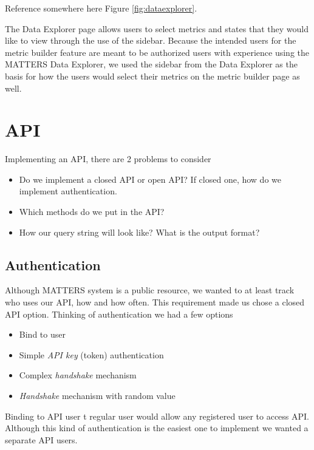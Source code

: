 			Reference somewhere here Figure \ref{fig:dataexplorer}.
			
			The Data Explorer page allows users to select metrics and states that they would like to view through the use of the sidebar. 
			Because the intended users for the metric builder feature are meant to be authorized users with 
			experience using the MATTERS Data Explorer, we used the sidebar from the Data Explorer as the 
			basis for how the users would select their metrics on the metric builder page as well.  

	\section{API}
			
			Implementing an API, there are 2 problems to consider
			\begin{itemize}
				\item
					Do we implement a closed API or open API? 
					If closed one, how do we implement authentication.
				\item
					Which methods do we put in the API?
				\item
					How our query string will look like? 
					What is the output format?
			\end{itemize}
			
			\subsection{Authentication}
				
				Although MATTERS system is a public resource, 
				we wanted to at least track who uses our API, how and how often. 
				This requirement made us chose a closed API option. 
				Thinking of authentication we had a few options
				
				\begin{itemize}
					\item
						Bind to user
					\item
						Simple \emph{API key} (token) authentication
					\item
						Complex \emph{handshake} mechanism					
					\item
						\emph{Handshake} mechanism with random value
				\end{itemize}
				
				Binding to API user t regular user would allow any registered user to access API. 
				Although this kind of authentication is the easiest one to implement we wanted a separate API users.
				
